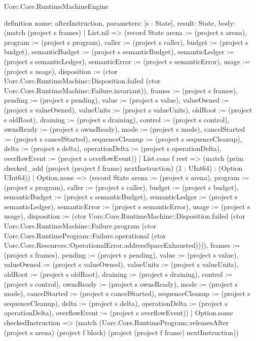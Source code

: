 \begin{lexlean}{Uorc.Core.RuntimeMachineEngine}
\begin{semanticmodule}
definition{
  name: afterInstruction,
  parameters: [s : State],
  result: State,
  body: (match (project s frames)
    | List.nil => (record State {arena := (project s arena), program := (project s program), caller := (project s caller), budget := (project s budget), semanticBudget := (project s semanticBudget), semanticLedger := (project s semanticLedger), semanticError := (project s semanticError), usage := (project s usage), disposition := (ctor Uorc.Core.RuntimeMachine::Disposition.failed (ctor Uorc.Core.RuntimeMachine::Failure.invariant)), frames := (project s frames), pending := (project s pending), value := (project s value), valueOwned := (project s valueOwned), valueUnits := (project s valueUnits), oldRoot := (project s oldRoot), draining := (project s draining), control := (project s control), ownsReady := (project s ownsReady), mode := (project s mode), cancelStarted := (project s cancelStarted), sequenceCleanup := (project s sequenceCleanup), delta := (project s delta), operationDelta := (project s operationDelta), overflowEvent := (project s overflowEvent)})
    | List.cons f rest => (match (prim checked_add (project (project f frame) nextInstruction) (1 : UInt64) : (Option UInt64))
      | Option.none => (record State {arena := (project s arena), program := (project s program), caller := (project s caller), budget := (project s budget), semanticBudget := (project s semanticBudget), semanticLedger := (project s semanticLedger), semanticError := (project s semanticError), usage := (project s usage), disposition := (ctor Uorc.Core.RuntimeMachine::Disposition.failed (ctor Uorc.Core.RuntimeMachine::Failure.program (ctor Uorc.Core.RuntimeProgram::Failure.operational (ctor Uorc.Core.Resources::OperationalError.addressSpaceExhausted)))), frames := (project s frames), pending := (project s pending), value := (project s value), valueOwned := (project s valueOwned), valueUnits := (project s valueUnits), oldRoot := (project s oldRoot), draining := (project s draining), control := (project s control), ownsReady := (project s ownsReady), mode := (project s mode), cancelStarted := (project s cancelStarted), sequenceCleanup := (project s sequenceCleanup), delta := (project s delta), operationDelta := (project s operationDelta), overflowEvent := (project s overflowEvent)})
      | Option.some checkedInstruction => (match (Uorc.Core.RuntimeProgram::releasesAfter (project s arena) (project f block) (project (project f frame) nextInstruction))
}
\end{semanticmodule}
\end{lexlean}
